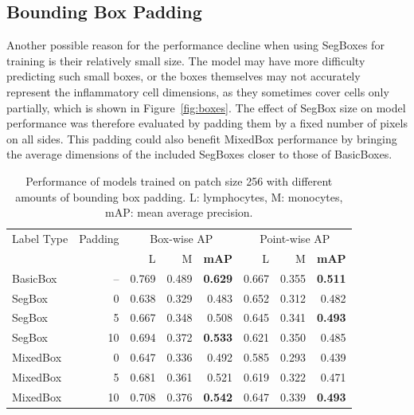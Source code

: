 \subsection{Bounding Box Padding}
Another possible reason for the performance decline when using SegBoxes for training is their relatively small size. The model may have more difficulty predicting such small boxes, or the boxes themselves may not accurately represent the inflammatory cell dimensions, as they sometimes cover cells only partially, which is shown in Figure~\ref{fig:boxes}. The effect of SegBox size on model performance was therefore evaluated by padding them by a fixed number of pixels on all sides. This padding could also benefit MixedBox performance by bringing the average dimensions of the included SegBoxes closer to those of BasicBoxes.

\begin{table}[!b]
    \centering
    \begin{tabular}{lr|rrrrrr}
        \toprule
        Label Type & Padding & \multicolumn{3}{c}{Box-wise AP} & \multicolumn{3}{c}{Point-wise AP} \\
        & & L & M & \textbf{mAP} & L & M & \textbf{mAP} \\
        \midrule
        BasicBox & -- & 0.769 & 0.489 & \textbf{0.629} & 0.667 & 0.355 & \textbf{0.511} \\
        \midrule
        SegBox & 0 & 0.638 & 0.329 & 0.483 & 0.652 & 0.312 & 0.482 \\
        SegBox & 5 & 0.667 & 0.348 & 0.508 & 0.645 & 0.341 & \textbf{0.493} \\
        SegBox & 10 & 0.694 & 0.372 & \textbf{0.533} & 0.621 & 0.350 & 0.485 \\
        \midrule
        MixedBox & 0 & 0.647 & 0.336 & 0.492 & 0.585 & 0.293 & 0.439 \\
        MixedBox & 5 & 0.681 & 0.361 & 0.521 & 0.619 & 0.322 & 0.471 \\
        MixedBox & 10 & 0.708 & 0.376 & \textbf{0.542} & 0.647 & 0.339 & \textbf{0.493} \\
        \bottomrule
    \end{tabular}
    \caption{Performance of models trained on patch size 256 with different amounts of bounding box padding. L: lymphocytes, M: monocytes, mAP: mean average precision.}
    \label{tab:exp_padding}
\end{table}

